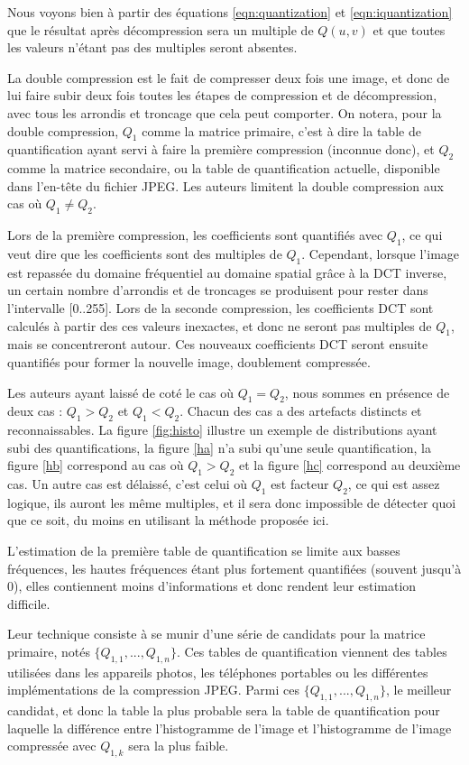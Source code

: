 \documentclass[utf8,final]{stageM2R} %
\begin{document}
Nous voyons bien à partir des équations \ref{eqn:quantization} et \ref{eqn:iquantization} que le résultat après décompression sera un multiple de $Q(u,v)$ et que toutes les valeurs n'étant pas des multiples seront absentes.

La double compression est le fait de compresser deux fois une image, et donc de lui faire subir deux fois toutes les étapes de compression et de décompression, avec tous les arrondis et troncage que cela peut comporter. On notera, pour la double compression, $Q_{1}$ comme la matrice primaire, c'est à dire la table de quantification ayant servi à faire la première compression (inconnue donc), et $Q_{2}$ comme la matrice secondaire, ou la table de quantification actuelle, disponible dans l'en-tête du fichier JPEG. Les auteurs limitent la double compression aux cas où $Q_{1} \neq Q_{2}$.

Lors de la première compression, les coefficients sont quantifiés avec $Q_{1}$, ce qui veut dire que les coefficients sont des multiples de $Q_{1}$. Cependant, lorsque l'image est repassée du domaine fréquentiel au domaine spatial grâce à la DCT inverse, un certain nombre d'arrondis et de troncages se produisent pour rester dans l'intervalle [0..255]. Lors de la seconde compression, les coefficients DCT sont calculés à partir des ces valeurs inexactes, et donc ne seront pas multiples de $Q_{1}$, mais se concentreront autour. Ces nouveaux coefficients DCT seront ensuite quantifiés pour former la nouvelle image, doublement compressée.

Les auteurs ayant laissé de coté le cas où $Q_{1} = Q_{2}$, nous sommes en présence de deux cas : $Q_{1} > Q_{2}$ et $Q_{1} < Q_{2}$. Chacun des cas a des artefacts distincts et reconnaissables. La figure \ref{fig:histo} illustre un exemple de distributions ayant subi des quantifications, la figure \ref{ha} n'a subi qu'une seule quantification, la figure \ref{hb} correspond au cas où $Q_{1} > Q_{2}$ et la figure \ref{hc} correspond au deuxième cas. Un autre cas est délaissé, c'est celui où $Q_{1}$ est facteur $Q_{2}$, ce qui est assez logique, ils auront les même multiples, et il sera donc impossible de détecter quoi que ce soit, du moins en utilisant la méthode proposée ici.

L'estimation de la première table de quantification se limite aux basses fréquences, les hautes fréquences étant plus fortement quantifiées (souvent jusqu'à 0), elles contiennent moins d'informations et donc rendent leur estimation difficile.

Leur technique consiste à se munir d'une série de candidats pour la matrice primaire, notés $\{Q_{1,1},...,Q_{1,n}\}$. Ces tables de quantification viennent des tables utilisées dans les appareils photos, les téléphones portables ou les différentes implémentations de la compression JPEG. Parmi ces $\{Q_{1,1},...,Q_{1,n}\}$, le meilleur candidat, et donc la table la plus probable sera la table de quantification pour laquelle la différence entre l'histogramme de l'image et l'histogramme de l'image compressée avec $Q_{1,k}$ sera la plus faible.
\end{document}

